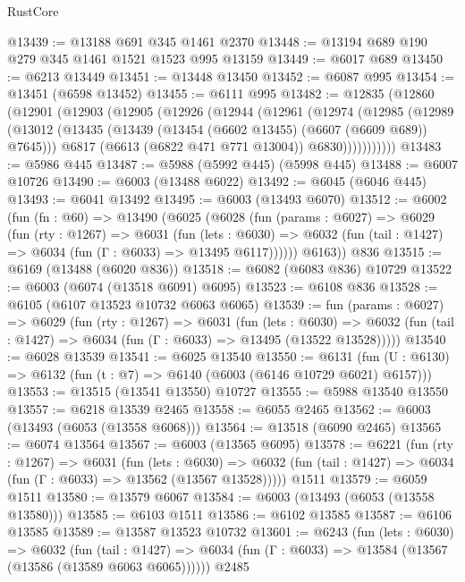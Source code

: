 \begin{lexlean}{RustCore}
\begin{coremodule}
@13439 := @13188 @691 @345 @1461 @2370
@13448 := @13194 @689 @190 @279 @345 @1461 @1521 @1523 @995 @13159
@13449 := @6017 @689
@13450 := @6213 @13449
@13451 := @13448 @13450
@13452 := @6087 @995
@13454 := @13451 (@6598 @13452)
@13455 := @6111 @995
@13482 := @12835
    (@12860
      (@12901
        (@12903
          (@12905
            (@12926
              (@12944
                (@12961
                  (@12974
                    (@12985
                      (@12989
                        (@13012
                          (@13435 (@13439 (@13454 (@6602 @13455) (@6607 (@6609 @689)) @7645)))
                          @6817
                          (@6613 (@6822 @471 @771 @13004))
                          @6830)))))))))))
@13483 := @5986 @445
@13487 := @5988 (@5992 @445) (@5998 @445)
@13488 := @6007 @10726
@13490 := @6003 (@13488 @6022)
@13492 := @6045 (@6046 @445)
@13493 := @6041 @13492
@13495 := @6003 (@13493 @6070)
@13512 := @6002
    (fun (fn : @60) =>
    @13490
      (@6025
        (@6028
          (fun (params : @6027) =>
          @6029
            (fun (rty : @1267) =>
            @6031
              (fun (lets : @6030) =>
              @6032 (fun (tail : @1427) => @6034 (fun (Γ : @6033) => @13495 @6117))))))
        @6163))
    @836
@13515 := @6169 (@13488 (@6020 @836))
@13518 := @6082 (@6083 @836) @10729
@13522 := @6003 (@6074 (@13518 @6091) @6095)
@13523 := @6108 @836
@13528 := @6105 (@6107 @13523 @10732 @6063 @6065)
@13539 := fun (params : @6027) =>
  @6029
    (fun (rty : @1267) =>
    @6031
      (fun (lets : @6030) =>
      @6032 (fun (tail : @1427) => @6034 (fun (Γ : @6033) => @13495 (@13522 @13528)))))
@13540 := @6028 @13539
@13541 := @6025 @13540
@13550 := @6131
    (fun (U : @6130) => @6132 (fun (t : @7) => @6140 (@6003 (@6146 @10729 @6021) @6157)))
@13553 := @13515 (@13541 @13550) @10727
@13555 := @5988 @13540 @13550
@13557 := @6218 @13539 @2465
@13558 := @6055 @2465
@13562 := @6003 (@13493 (@6053 (@13558 @6068)))
@13564 := @13518 (@6090 @2465)
@13565 := @6074 @13564
@13567 := @6003 (@13565 @6095)
@13578 := @6221
    (fun (rty : @1267) =>
    @6031
      (fun (lets : @6030) =>
      @6032 (fun (tail : @1427) => @6034 (fun (Γ : @6033) => @13562 (@13567 @13528)))))
    @1511
@13579 := @6059 @1511
@13580 := @13579 @6067
@13584 := @6003 (@13493 (@6053 (@13558 @13580)))
@13585 := @6103 @1511
@13586 := @6102 @13585
@13587 := @6106 @13585
@13589 := @13587 @13523 @10732
@13601 := @6243
    (fun (lets : @6030) =>
    @6032
      (fun (tail : @1427) =>
      @6034 (fun (Γ : @6033) => @13584 (@13567 (@13586 (@13589 @6063 @6065))))))
    @2485

\end{coremodule}
\end{lexlean}
